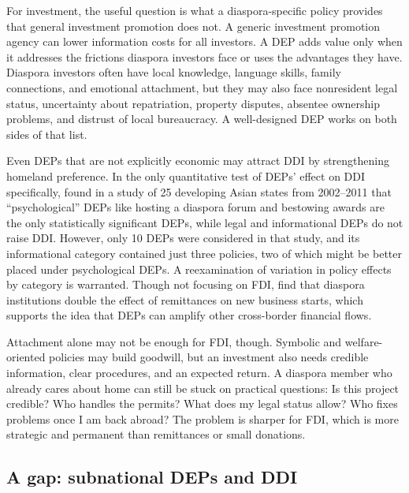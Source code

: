 \documentclass[12pt]{article}
\begin{document}
For investment, the useful question is what a diaspora-specific policy provides that general investment promotion does not. A generic investment promotion agency can lower information costs for all investors. A DEP adds value only when it addresses the frictions diaspora investors face or uses the advantages they have. Diaspora investors often have local knowledge, language skills, family connections, and emotional attachment, but they may also face nonresident legal status, uncertainty about repatriation, property disputes, absentee ownership problems, and distrust of local bureaucracy. A well-designed DEP works on both sides of that list.

Even DEPs that are not explicitly economic may attract DDI by strengthening homeland preference. In the only quantitative test of DEPs' effect on DDI specifically, \citet{park_courting_2021} found in a study of 25 developing Asian states from 2002--2011 that ``psychological'' DEPs like hosting a diaspora forum and bestowing awards are the only statistically significant DEPs, while legal and informational DEPs do not raise DDI. However, only 10 DEPs were considered in that study, and its informational category contained just three policies, two of which might be better placed under psychological DEPs. A reexamination of variation in policy effects by category is warranted. Though not focusing on FDI, \citet{gamlen_human_2019} find that diaspora institutions double the effect of remittances on new business starts, which supports the idea that DEPs can amplify other cross-border financial flows.

Attachment alone may not be enough for FDI, though. Symbolic and welfare-oriented policies may build goodwill, but an investment also needs credible information, clear procedures, and an expected return. A diaspora member who already cares about home can still be stuck on practical questions: Is this project credible? Who handles the permits? What does my legal status allow? Who fixes problems once I am back abroad? The problem is sharper for FDI, which is more strategic and permanent than remittances or small donations.

\subsection{A gap: subnational DEPs and DDI}
\end{document}
